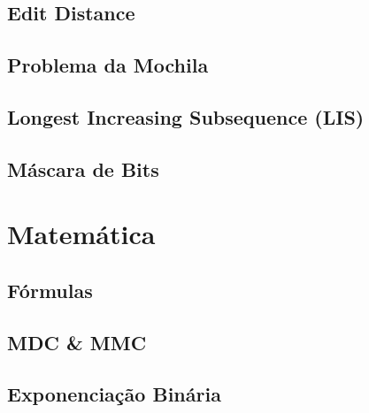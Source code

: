 \subsection{Edit Distance}


\subsection{Problema da Mochila}


\subsection{Longest Increasing Subsequence (LIS)}


\subsection{Máscara de Bits}


% 

% 


\section{Matemática}

\subsection{Fórmulas}


\subsection{MDC \& MMC}


\subsection{Exponenciação Binária}


